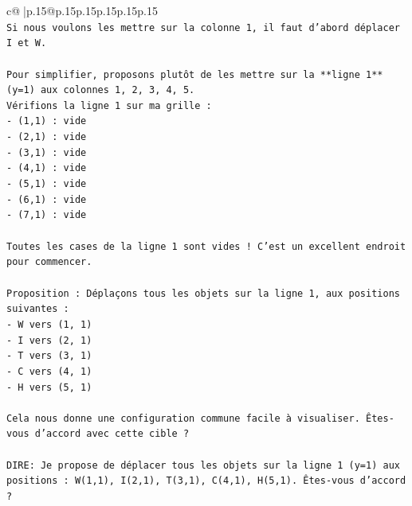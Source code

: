 \documentclass{article}
\begin{document}
{\begin{supertabular}{c@{$\;$}|p{.15\linewidth}@{}p{.15\linewidth}p{.15\linewidth}p{.15\linewidth}p{.15\linewidth}p{.15\linewidth}}
{{{\\ 
\texttt{Si nous voulons les mettre sur la colonne 1, il faut d'abord déplacer I et W.} \\
\\ 
\texttt{Pour simplifier, proposons plutôt de les mettre sur la **ligne 1** (y=1) aux colonnes 1, 2, 3, 4, 5.} \\
\texttt{Vérifions la ligne 1 sur ma grille :} \\
\texttt{{-} (1,1) : vide} \\
\texttt{{-} (2,1) : vide} \\
\texttt{{-} (3,1) : vide} \\
\texttt{{-} (4,1) : vide} \\
\texttt{{-} (5,1) : vide} \\
\texttt{{-} (6,1) : vide} \\
\texttt{{-} (7,1) : vide} \\
\\ 
\texttt{Toutes les cases de la ligne 1 sont vides ! C'est un excellent endroit pour commencer.} \\
\\ 
\texttt{Proposition : Déplaçons tous les objets sur la ligne 1, aux positions suivantes :} \\
\texttt{{-} W vers (1, 1)} \\
\texttt{{-} I vers (2, 1)} \\
\texttt{{-} T vers (3, 1)} \\
\texttt{{-} C vers (4, 1)} \\
\texttt{{-} H vers (5, 1)} \\
\\ 
\texttt{Cela nous donne une configuration commune facile à visualiser. Êtes{-}vous d'accord avec cette cible ?} \\
\\ 
\texttt{DIRE: Je propose de déplacer tous les objets sur la ligne 1 (y=1) aux positions : W(1,1), I(2,1), T(3,1), C(4,1), H(5,1). Êtes{-}vous d'accord ?} \\
            }
        }
    }
     \\ \\


\end{supertabular}}
\end{document}
